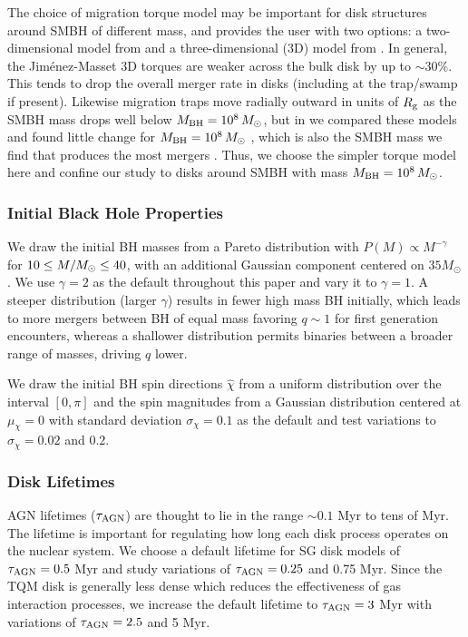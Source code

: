 The choice of migration torque model may be important for disk structures around SMBH of different mass, and \mcfacts provides the user with two options: a two-dimensional model from \citet{Paardekooper+10} and a three-dimensional (3D) model from \citet{JimenezMassset17}.
In general, the Jim\'enez-Masset 3D torques are weaker across the bulk disk by up to $\sim$30\%.
This tends to drop the overall merger rate in disks (including at the trap/swamp if present).
Likewise migration traps move radially outward in units of $R_{\rm g}$ as the SMBH mass drops well below $M_{\rm BH}=10^8\,M_{\odot}$, but in \citet{McKernan+25-mcfactsI} we compared these models and found little change for $M_{\rm BH} = 10^8\,M_{\odot}$ \citep[see Fig. 6 \& 7 of][]{McKernan+25-mcfactsI}, which is also the SMBH mass we find that produces the most mergers \citep{Delfavero+25-mcfactsIII}.
Thus, we choose the simpler \citet{Paardekooper+10} torque model here and confine our study to disks around SMBH with mass $M_{\rm BH} = 10^8\,M_{\odot}$.

\subsubsection{Initial Black Hole Properties}
We draw the initial BH masses from a Pareto distribution with $P(M) \propto M^{-\gamma}$ for $10\leq M/M_{\odot} \leq40$, with an additional Gaussian component centered on $35M_{\odot}$ \citet[see][]{McKernan+25-mcfactsI}.
We use $\gamma=2$ as the default throughout this paper and vary it to $\gamma=1$.
A steeper distribution (larger $\gamma$) results in fewer high mass BH initially, which leads to more mergers between BH of equal mass favoring $q\sim1$ for first generation encounters, whereas a shallower distribution permits binaries between a broader range of masses, driving $q$ lower.

We draw the initial BH spin directions $\hat{\chi}$ from a uniform distribution over the interval $[0,\pi]$ and the spin magnitudes from a Gaussian distribution centered at $\mu_\chi=0$ with standard deviation $\sigma_{\chi} = 0.1$ as the default and test variations to $\sigma_{\chi}=0.02$ and $0.2$.

\subsubsection{Disk Lifetimes}
AGN lifetimes ($\tau_{\rm AGN}$) are thought to lie in the range $\sim 0.1$ Myr to tens of Myr.
The lifetime is important for regulating how long each disk process operates on the nuclear system.
We choose a default lifetime for SG disk models of $\tau_{\rm AGN}=0.5$ Myr and study variations of $\tau_{\rm AGN} = 0.25$ and 0.75 Myr.
Since the TQM disk is generally less dense which reduces the effectiveness of gas interaction processes, we increase the default lifetime to $\tau_{\rm AGN} = 3$ Myr with variations of $\tau_{\rm AGN} = 2.5$ and 5 Myr.

